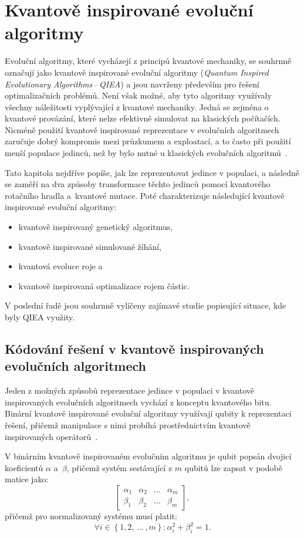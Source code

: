 \chapter{Kvantově inspirované evoluční algoritmy} \label{chapt:qiea}
Evoluční algoritmy, které vycházejí z principů kvantové mechaniky, se souhrnně označují jako kvantově inspirované evoluční algoritmy (\emph{Quantum Inspired Evolutionary Algorithms\,--\,QIEA}) a jsou navrženy především pro řešení optimalizačních problémů. 
Není však možné, aby tyto algoritmy využívaly všechny náležitosti vyplývající z kvantové mechaniky. 
Jedná se zejména o kvantové provázání, které nelze efektivně simulovat na klasických počítačích. 
Nicméně použití kvantově inspirované reprezentace v evolučních algoritmech zaručuje dobrý kompromis mezi průzkumem a exploatací, a to často při použití menší populace jedinců, než by bylo nutné u klasických evolučních algoritmů~\cite{NaturalComputing}.

Tato kapitola nejdříve popíše, jak lze reprezentovat jedince v populaci, a následně se zaměří na dva způsoby transformace těchto jedinců pomocí kvantového rotačního hradla a~kvantové mutace. 
Poté charakterizuje následující kvantově inspirované evoluční algoritmy:
\begin{itemize}
    \item kvantově inspirovaný genetický algoritmus,
    \item kvantově inspirované simulované žíhání,
    \item kvantová evoluce roje a
    \item kvantově inspirovaná optimalizace rojem částic.
\end{itemize}
V poslední řadě jsou souhrnně vylíčeny zajímavé studie popisující situace, kde byly QIEA využity. 

\section{Kódování řešení v kvantově inspirovaných evolučních algoritmech}
Jeden z možných způsobů reprezentace jedince v populaci v kvantově inspirovaných evolučních algoritmech vychází z konceptu kvantového bitu. 
Binární kvantově inspirované evoluční algoritmy využívají qubity k reprezentaci řešení, přičemž manipulace s nimi probíhá prostřednictvím kvantově inspirovaných operátorů~\cite{NaturalComputing}. 

V binárním kvantově inspirovaném evolučním algoritmu je qubit popsán dvojicí koeficientů $\alpha$ a~$\beta$, přičemž systém sestávající z $m$ qubitů lze zapsat v podobě matice jako: 
\begin{equation}\label{eq:quantum-representation}
    \begin{bmatrix}
        \alpha_1 & \alpha_2 & \dots & \alpha_m \\
        \beta_1  & \beta_2  & \dots & \beta_m
    \end{bmatrix},
\end{equation}
přičemž pro normalizovaný systému musí platit:
\begin{equation}\label{eq:normalized-quantum-representation}
    \forall i \in \left\{1,2,\,\dots\,,m \right\}: \alpha^2_i + \beta^2_i = 1.
\end{equation}

